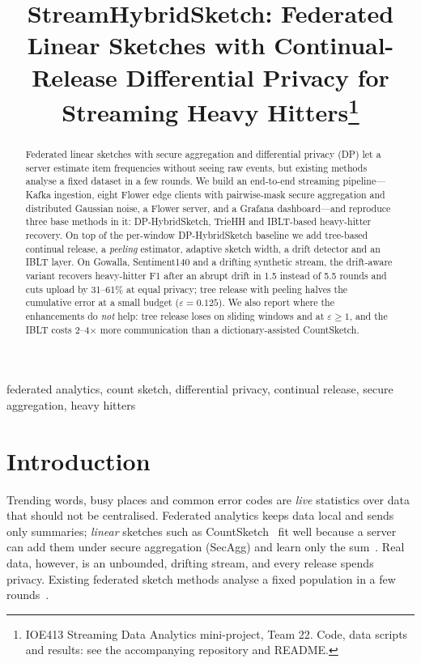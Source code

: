\documentclass[conference]{IEEEtran}
\newcommand{\eps}{\varepsilon}
\begin{document}
\title{StreamHybridSketch: Federated Linear Sketches with Continual-Release Differential Privacy for Streaming Heavy Hitters\thanks{IOE413 Streaming Data Analytics mini-project, Team 22. Code, data scripts and results: see the accompanying repository and README.}}

\author{
\and
{}
\and
{}
\and
{}
}

\maketitle

\begin{abstract}
Federated linear sketches with secure aggregation and differential privacy (DP) let a server estimate item
frequencies without seeing raw events, but existing methods analyse a fixed dataset in a few rounds. We build an
end-to-end streaming pipeline---Kafka ingestion, eight Flower edge clients with pairwise-mask secure aggregation and
distributed Gaussian noise, a Flower server, and a Grafana dashboard---and reproduce three base methods in it:
DP-HybridSketch, TrieHH and IBLT-based heavy-hitter recovery. On top of the per-window DP-HybridSketch baseline we add
tree-based continual release, a \emph{peeling} estimator, adaptive sketch width, a drift detector and an IBLT layer.
On Gowalla, Sentiment140 and a drifting synthetic stream, the drift-aware variant recovers heavy-hitter F1 after an
abrupt drift in 1.5 instead of 5.5 rounds and cuts upload by 31--61\% at equal privacy; tree release with peeling halves
the cumulative error at a small budget ($\eps=0.125$). We also report where the enhancements do \emph{not} help: tree
release loses on sliding windows and at $\eps\ge1$, and the IBLT costs 2--4$\times$ more communication than a
dictionary-assisted CountSketch.
\end{abstract}

\begin{IEEEkeywords}
federated analytics, count sketch, differential privacy, continual release, secure aggregation, heavy hitters
\end{IEEEkeywords}

\section{Introduction}
Trending words, busy places and common error codes are \emph{live} statistics over data that should not be
centralised. Federated analytics keeps data local and sends only summaries; \emph{linear} sketches such as
CountSketch~\cite{charikar2002} fit well because a server can add them under secure aggregation (SecAgg) and learn
only the sum~\cite{wu2023,bonawitz2017}. Real data, however, is an unbounded, drifting stream, and every release
spends privacy. Existing federated sketch methods analyse a fixed population in a few rounds~\cite{wu2023,zhu2020,gascon2023}.
\end{document}

